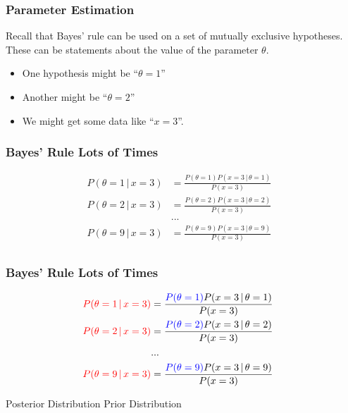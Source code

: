 \documentclass{beamer}
\newcommand{\given}{\,|\,}
\begin{document}
\begin{frame}
\frametitle{Parameter Estimation}
Recall that Bayes' rule can be used on a set of mutually exclusive hypotheses.
These can be statements about the value of the parameter $\theta$.\pause

\begin{itemize}
\item One hypothesis might be ``$\theta = 1$'' \pause
\item Another might be ``$\theta = 2$'' \pause
\item We might get some data like ``$x = 3$''.
\end{itemize}

\end{frame}


\begin{frame}
\frametitle{Bayes' Rule Lots of Times}
\begin{align}
P(\theta = 1 \given x = 3) &= \frac{P(\theta=1)P(x=3 \given \theta=1)}{P(x=3)}\\
P(\theta = 2 \given x = 3) &= \frac{P(\theta=2)P(x=3 \given \theta=2)}{P(x=3)}\\
&...&\\
P(\theta = 9 \given x = 3) &= \frac{P(\theta=9)P(x=3 \given \theta=9)}{P(x=3)}\\
\end{align}

\end{frame}

\begin{frame}
\frametitle{Bayes' Rule Lots of Times}
\begin{align}
\color{red}{P(\theta = 1 \given x = 3)} &= \frac{{\color{blue}P(\theta=1)}P(x=3 \given \theta=1)}{P(x=3)}\\
\color{red}{P(\theta = 2 \given x = 3)} &= \frac{{\color{blue}P(\theta=2)}P(x=3 \given \theta=2)}{P(x=3)}\\
&...&\\
\color{red}{P(\theta = 9 \given x = 3)} &= \frac{{\color{blue}P(\theta=9)}P(x=3 \given \theta=9)}{P(x=3)}\\
\end{align}

{\color{red}Posterior Distribution}
{\color{blue}Prior Distribution}

\end{frame}
\end{document}
